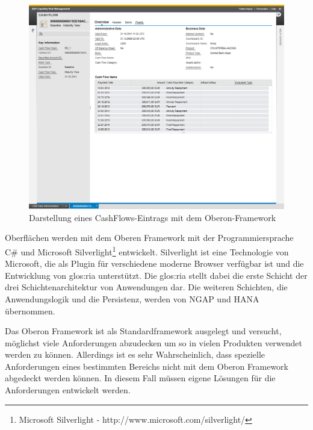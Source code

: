 \begin{onehalfspacing}
\begin{figure}[h]
\centering
\setlength{\unitlength}{1mm}
\includegraphics[width=15cm]{images/OberonUI.png}
\caption{Darstellung eines CashFlows-Eintrags mit dem Oberon-Framework\label{fig:oberon}}
\end{figure}
Oberflächen werden mit dem Oberen Framework mit der Programmiersprache C\# und Microsoft Silverlight\footnote{Microsoft Silverlight - http://www.microsoft.com/silverlight/} entwickelt. Silverlight ist eine Technologie von Microsoft, die als Plugin für verschiedene moderne Browser verfügbar ist und die Entwicklung von \gls{glos:ria} unterstützt. Die \gls{glos:ria} stellt dabei die erste Schicht der drei Schichtenarchitektur von Anwendungen dar. Die weiteren Schichten, die Anwendungslogik und die Persistenz, werden von NGAP und HANA übernommen.

Das Oberon Framework ist als Standardframework ausgelegt und versucht, möglichst viele Anforderungen abzudecken um so in vielen Produkten verwendet werden zu können. Allerdings ist es sehr Wahrscheinlich, dass spezielle Anforderungen eines bestimmten Bereichs nicht mit dem Oberon Framework abgedeckt werden können. In diesem Fall müssen eigene Lösungen für die Anforderungen entwickelt werden.


\end{onehalfspacing}
